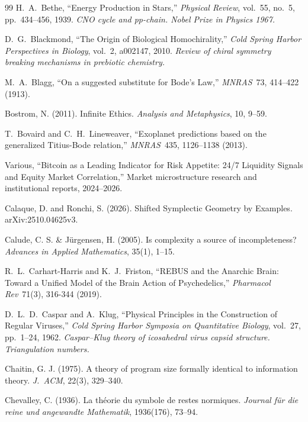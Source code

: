 \documentclass[12pt,oneside]{book}
\theoremstyle{principia}
\theoremstyle{definition}
\theoremstyle{remark}
\begin{document}
\begin{thebibliography}{99}
H.~A.~Bethe,
``Energy Production in Stars,''
\emph{Physical Review}, vol.~55, no.~5, pp.~434--456, 1939.
\textit{CNO cycle and pp-chain. Nobel Prize in Physics 1967.}

D.~G.~Blackmond,
``The Origin of Biological Homochirality,''
\emph{Cold Spring Harbor Perspectives in Biology}, vol.~2, a002147, 2010.
\textit{Review of chiral symmetry breaking mechanisms in prebiotic chemistry.}

M.~A.~Blagg, ``On a suggested substitute for Bode's Law,'' \emph{MNRAS}\ 73, 414--422 (1913).

Bostrom, N. (2011). Infinite Ethics. \emph{Analysis and Metaphysics}, 10, 9--59.

T.~Bovaird and C.~H.~Lineweaver, ``Exoplanet predictions based on the generalized Titius-Bode relation,'' \emph{MNRAS}\ 435, 1126--1138 (2013).

Various,
``Bitcoin as a Leading Indicator for Risk Appetite: 24/7 Liquidity Signals and Equity Market Correlation,''
Market microstructure research and institutional reports, 2024--2026.

Calaque, D. and Ronchi, S. (2026). Shifted Symplectic Geometry by Examples. arXiv:2510.04625v3.

Calude, C. S. \& J\"urgensen, H. (2005). Is complexity a source of incompleteness? \emph{Advances in Applied Mathematics}, 35(1), 1--15.

R.~L.~Carhart-Harris and K.~J.~Friston, ``REBUS and the Anarchic Brain: Toward a Unified Model of the Brain Action of Psychedelics,'' \emph{Pharmacol Rev}\ 71(3), 316-344 (2019).

D.~L.~D.~Caspar and A.~Klug,
``Physical Principles in the Construction of Regular Viruses,''
\emph{Cold Spring Harbor Symposia on Quantitative Biology}, vol.~27, pp.~1--24, 1962.
\textit{Caspar--Klug theory of icosahedral virus capsid structure. Triangulation numbers.}

Chaitin, G. J. (1975). A theory of program size formally identical to information theory. \emph{J.\ ACM}, 22(3), 329--340.

Chevalley, C. (1936). La th\'eorie du symbole de restes normiques. \emph{Journal f\"ur die reine und angewandte Mathematik}, 1936(176), 73--94.


\end{thebibliography}
\end{document}
